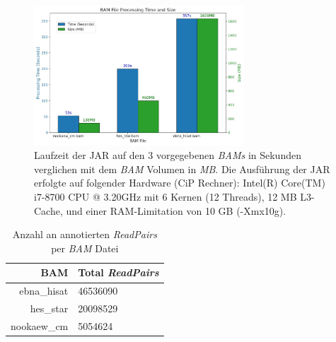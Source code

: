 \documentclass[12pt]{article}
\begin{document}
\begin{figure}[htpb]
    \centering
    \includegraphics[width=0.7\textwidth]{./plots/times_bam.jpg}
    \caption{Laufzeit der JAR auf den 3 vorgegebenen \textit{BAMs} in Sekunden verglichen mit dem \textit{BAM} Volumen in \textit{MB}. 
    Die Ausführung der JAR erfolgte auf folgender Hardware (CiP Rechner): Intel(R) Core(TM) i7-8700 CPU @ 3.20GHz mit 6 Kernen (12 Threads), 12 MB L3-Cache, und einer RAM-Limitation von 10 GB (-Xmx10g). }
    \label{fig:-plots-times_bam-jpg}
\end{figure}

\begin{table}[htpb]
    \centering
    \caption{Anzahl an annotierten \textit{ReadPairs} per \textit{BAM} Datei}
    \label{tab:amount}

    \begin{tabular}{r|l}
        \textbf{BAM} & \textbf{Total \textit{ReadPairs}} \\ \hline
          ebna\_hisat   & 46536090 \\
          hes\_star    & 20098529 \\
          nookaew\_cm    &  5054624 \\
    \end{tabular}
\end{table}






\newpage
\printbibliography


\end{document}

